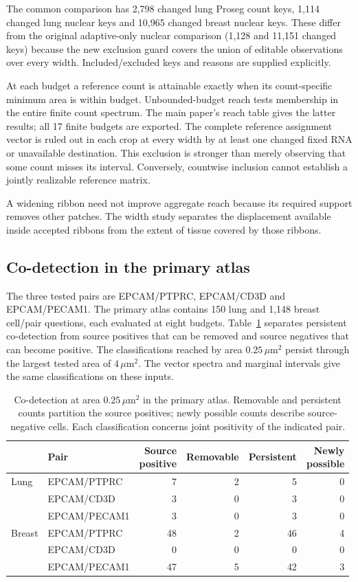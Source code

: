 \documentclass[10pt,letterpaper]{article}
\begin{document}
The common comparison has 2,798 changed lung Proseg count keys, 1,114 changed lung nuclear keys and 10,965 changed breast nuclear keys. These differ from the original adaptive-only nuclear comparison (1,128 and 11,151 changed keys) because the new exclusion guard covers the union of editable observations over every width. Included/excluded keys and reasons are supplied explicitly.

At each budget a reference count is attainable exactly when its count-specific minimum area is within budget. Unbounded-budget reach tests membership in the entire finite count spectrum. The main paper's reach table gives the latter results; all 17 finite budgets are exported. The complete reference assignment vector is ruled out in each crop at every width by at least one changed fixed RNA or unavailable destination. This exclusion is stronger than merely observing that some count misses its interval. Conversely, countwise inclusion cannot establish a jointly realizable reference matrix.

A widening ribbon need not improve aggregate reach because its required support removes other patches. The width study separates the displacement available inside accepted ribbons from the extent of tissue covered by those ribbons.

\subsection{Co-detection in the primary atlas}
The three tested pairs are EPCAM/PTPRC, EPCAM/CD3D and EPCAM/PECAM1. The primary atlas contains 150 lung and 1,148 breast cell/pair questions, each evaluated at eight budgets. Table~\ref{tab:codetection} separates persistent co-detection from source positives that can be removed and source negatives that can become positive. The classifications reached by area $0.25\,\mu\mathrm m^2$ persist through the largest tested area of $4\,\mu\mathrm m^2$. The vector spectra and marginal intervals give the same classifications on these inputs.

\begin{table}[ht]\centering
\begin{tabular}{llrrrr}\toprule
 &Pair&\shortstack{Source\\positive}&Removable&Persistent&\shortstack{Newly\\possible}\\\midrule
Lung&EPCAM/PTPRC&7&2&5&0\\
 &EPCAM/CD3D&3&0&3&0\\
 &EPCAM/PECAM1&3&0&3&0\\
Breast&EPCAM/PTPRC&48&2&46&4\\
 &EPCAM/CD3D&0&0&0&0\\
 &EPCAM/PECAM1&47&5&42&3\\\bottomrule
\end{tabular}
\caption{Co-detection at area $0.25\,\mu\mathrm m^2$ in the primary atlas. Removable and persistent counts partition the source positives; newly possible counts describe source-negative cells. Each classification concerns joint positivity of the indicated pair.}\label{tab:codetection}
\end{table}
\end{document}
